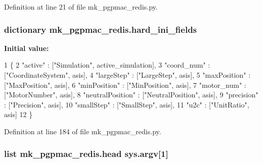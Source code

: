 Definition at line 21 of file mk\-\_\-pgpmac\-\_\-redis.\-py.

\hypertarget{namespacemk__pgpmac__redis_a8257226983aee079ec66f5cc67e194ec}{
\subsubsection[{hard\-\_\-ini\-\_\-fields}]{\setlength{\rightskip}{0pt plus 5cm}dictionary mk\-\_\-pgpmac\-\_\-redis.\-hard\-\_\-ini\-\_\-fields}}\label{namespacemk__pgpmac__redis_a8257226983aee079ec66f5cc67e194ec}
{\bfseries Initial value\-:}
\begin{DoxyCode}
1 \{
2     \textcolor{stringliteral}{"active"}          : [\textcolor{stringliteral}{"Simulation"}, active\_simulation],
3     \textcolor{stringliteral}{"coord\_num"}       : [\textcolor{stringliteral}{"CoordinateSystem"}, asis],
4     \textcolor{stringliteral}{"largeStep"}       : [\textcolor{stringliteral}{"LargeStep"}, asis],
5     \textcolor{stringliteral}{"maxPosition"}     : [\textcolor{stringliteral}{"MaxPosition"}, asis],
6     \textcolor{stringliteral}{"minPosition"}     : [\textcolor{stringliteral}{"MinPosition"}, asis],
7     \textcolor{stringliteral}{"motor\_num"}       : [\textcolor{stringliteral}{"MotorNumber"}, asis],
8     \textcolor{stringliteral}{"neutralPosition"} : [\textcolor{stringliteral}{"NeutralPosition"}, asis],
9     \textcolor{stringliteral}{"precision"}       : [\textcolor{stringliteral}{"Precision"}, asis],
10     \textcolor{stringliteral}{"smallStep"}       : [\textcolor{stringliteral}{"SmallStep"}, asis],
11     \textcolor{stringliteral}{"u2c"}             : [\textcolor{stringliteral}{"UnitRatio"}, asis]
12     \}
\end{DoxyCode}


Definition at line 184 of file mk\-\_\-pgpmac\-\_\-redis.\-py.

\hypertarget{namespacemk__pgpmac__redis_a760ff4955cbf5beef4ae36a28c30b01a}{
\subsubsection[{head}]{\setlength{\rightskip}{0pt plus 5cm}list mk\-\_\-pgpmac\-\_\-redis.\-head sys.\-argv\mbox{[}1\mbox{]}}}\label{namespacemk__pgpmac__redis_a760ff4955cbf5beef4ae36a28c30b01a}


